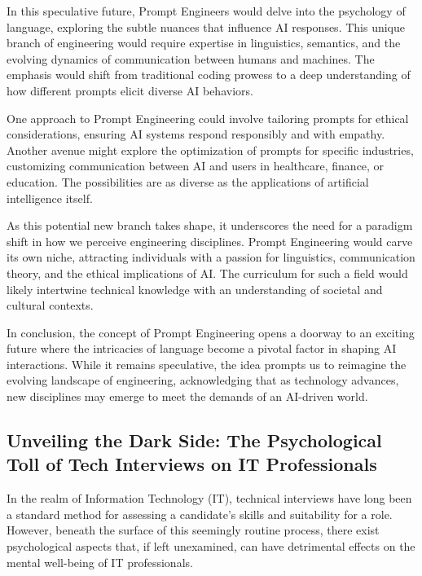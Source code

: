 \documentclass[
    a4paper, %
    10pt, %
    unnumberedsections, %
    twoside, %
]{LTJournalArticle}
\begin{document}
In this speculative future, Prompt Engineers would delve into the psychology of language, exploring the subtle nuances that influence AI responses. This unique branch of engineering would require expertise in linguistics, semantics, and the evolving dynamics of communication between humans and machines. The emphasis would shift from traditional coding prowess to a deep understanding of how different prompts elicit diverse AI behaviors.

One approach to Prompt Engineering could involve tailoring prompts for ethical considerations, ensuring AI systems respond responsibly and with empathy. Another avenue might explore the optimization of prompts for specific industries, customizing communication between AI and users in healthcare, finance, or education. The possibilities are as diverse as the applications of artificial intelligence itself.

As this potential new branch takes shape, it underscores the need for a paradigm shift in how we perceive engineering disciplines. Prompt Engineering would carve its own niche, attracting individuals with a passion for linguistics, communication theory, and the ethical implications of AI. The curriculum for such a field would likely intertwine technical knowledge with an understanding of societal and cultural contexts.

In conclusion, the concept of Prompt Engineering opens a doorway to an exciting future where the intricacies of language become a pivotal factor in shaping AI interactions. While it remains speculative, the idea prompts us to reimagine the evolving landscape of engineering, acknowledging that as technology advances, new disciplines may emerge to meet the demands of an AI-driven world.






\subsection{Unveiling the Dark Side: The Psychological Toll of Tech Interviews on IT Professionals}


In the realm of Information Technology (IT), technical interviews have long been a standard method for assessing a candidate's skills and suitability for a role. However, beneath the surface of this seemingly routine process, there exist psychological aspects that, if left unexamined, can have detrimental effects on the mental well-being of IT professionals.
\end{document}
